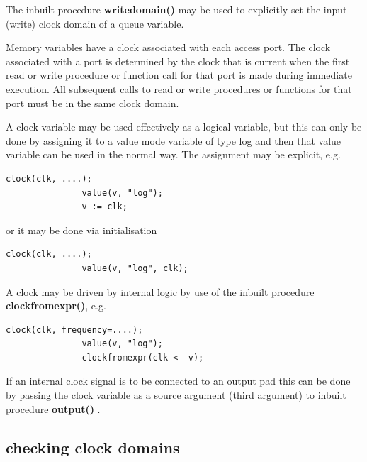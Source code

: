             The inbuilt procedure {\bf writedomain()} may be used to explicitly
            set the input (write) clock domain of a queue variable.

            Memory variables have a clock associated with each access port.
            The clock associated with a port is determined by the clock that
            is current when the first read or write procedure or function
            call for that port is made during immediate execution. All
            subsequent calls to read or write procedures or functions for
            that port must be in the same clock domain.
                      
            A clock variable may be used effectively as a logical variable,
            but this can only be done by assigning it to a value mode
            variable of type log and then that value variable can be used
            in the normal way. The assignment may be explicit, e.g.
            \begin{lstlisting}[gobble=12, language=threepl]
               clock(clk, ....);
               value(v, "log");
               v := clk;
            \end{lstlisting}
            or it may be done via initialisation
            \begin{lstlisting}[gobble=12, language=threepl]
               clock(clk, ....);
               value(v, "log", clk);
            \end{lstlisting}
            
            A clock may be driven by internal logic by use of the inbuilt
            procedure {\bf clockfromexpr()}, e.g.
            \begin{lstlisting}[gobble=12, language=threepl]
               clock(clk, frequency=....);
               value(v, "log");
               clockfromexpr(clk <- v);
            \end{lstlisting}
            
            If an internal clock signal is to be connected to an output pad
            this can be done by passing the clock variable as a source
            argument (third argument) to inbuilt procedure {\bf output()}
            .

        \subsection{checking clock domains}
        
